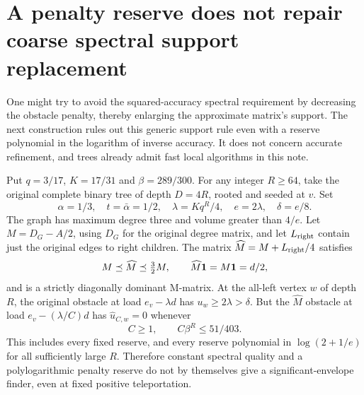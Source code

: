 \section{A penalty reserve does not repair coarse spectral support replacement}
\label{sec:op3-spectral-load-reserve-obstruction}

One might try to avoid the squared-accuracy spectral requirement by
decreasing the obstacle penalty, thereby enlarging the approximate
matrix's support. The next construction rules out this generic support
rule even with a reserve polynomial in the logarithm of inverse accuracy.
It does not concern accurate refinement, and trees already admit fast
local algorithms in this note.

\begin{theorem}
\label{thm:op3-spectral-load-reserve-obstruction}
Put $q=3/17$, $K=17/31$ and $\beta=289/300$. For any integer
$R\geq64$, take the original complete binary tree of depth $D=4R$,
rooted and seeded at $v$. Set
\[
 \alpha=1/3,\quad t=\bar\alpha=1/2,\quad
 \lambda=Kq^R/4,\quad e=2\lambda,\quad\delta=e/8.
\]
The graph has maximum degree three and volume greater than $4/e$.
Let $M=D_G-A/2$, using $D_G$ for the original degree matrix, and
let $L_{\rm right}$ contain just the original edges to right children.
The matrix $\widehat M=M+L_{\rm right}/4$ satisfies
\[
 M\preceq\widehat M\preceq\tfrac32M,\qquad
 \widehat M\mathbf{1}=M\mathbf{1}=d/2,
\]
and is a strictly diagonally dominant M-matrix. At the all-left vertex
$w$ of depth $R$, the original obstacle at load $e_v-\lambda d$ has
$u_w\geq2\lambda>\delta$. But the $\widehat M$ obstacle at load
$e_v-(\lambda/C)d$ has $\widehat u_{C,w}=0$ whenever
\begin{equation}
 C\geq1,\qquad C\beta^R\leq51/403.
 \label{eq:op3-reserve-failure-condition}
\end{equation}
This includes every fixed reserve, and every reserve polynomial in
$\log(2+1/e)$ for all sufficiently large $R$. Therefore constant spectral
quality and a polylogarithmic penalty reserve do not by themselves give
a significant-envelope finder, even at fixed positive teleportation.
\end{theorem}
